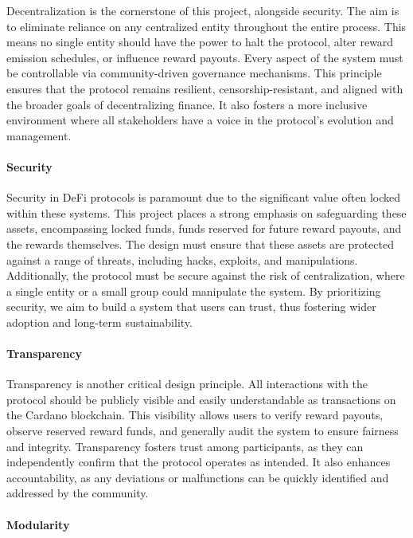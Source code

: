 \documentclass[12pt,parskip=full, tikz]{article}
\begin{document}
Decentralization is the cornerstone of this project, alongside security. The aim is to eliminate reliance on any centralized entity throughout the entire process. This means no single entity should have the power to halt the protocol, alter reward emission schedules, or influence reward payouts. Every aspect of the system must be controllable via community-driven governance mechanisms. This principle ensures that the protocol remains resilient, censorship-resistant, and aligned with the broader goals of decentralizing finance. It also fosters a more inclusive environment where all stakeholders have a voice in the protocol's evolution and management.

\paragraph{Security}

Security in DeFi protocols is paramount due to the significant value often locked within these systems. This project places a strong emphasis on safeguarding these assets, encompassing locked funds, funds reserved for future reward payouts, and the rewards themselves. The design must ensure that these assets are protected against a range of threats, including hacks, exploits, and manipulations. Additionally, the protocol must be secure against the risk of centralization, where a single entity or a small group could manipulate the system. By prioritizing security, we aim to build a system that users can trust, thus fostering wider adoption and long-term sustainability.

\paragraph{Transparency}

Transparency is another critical design principle. All interactions with the protocol should be publicly visible and easily understandable as transactions on the Cardano blockchain. This visibility allows users to verify reward payouts, observe reserved reward funds, and generally audit the system to ensure fairness and integrity. Transparency fosters trust among participants, as they can independently confirm that the protocol operates as intended. It also enhances accountability, as any deviations or malfunctions can be quickly identified and addressed by the community.

\paragraph{Modularity}
\end{document}
